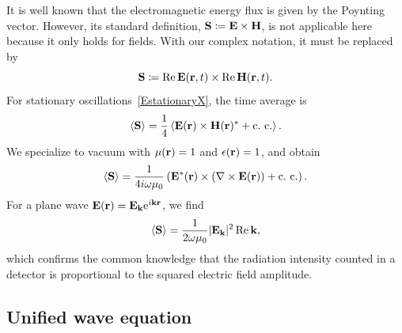 It is well known that the electromagnetic energy flux is given by the Poynting vector.
%
%
%
However, its standard definition, $\mathbf{S}\coloneqq\mathbf{E}\times\mathbf{H}$,
is not applicable here because it only holds for  fields.
With our complex notation, it must be replaced by
\begin{equation}
  \mathbf{S}\coloneqq \operatorname{Re}\mathbf{E}(\mathbf{r},t)\times\operatorname{Re}\mathbf{H}(\mathbf{r},t).
\end{equation}
%
For stationary oscillations~\cref{EstationaryX},
the time average is
\begin{equation}
  \braket{\mathbf{S}} = \frac{1}{4}\braket{\mathbf{E}(\mathbf{r}) \times \mathbf{H}(\mathbf{r})^* + \text{c.~c.}}.
\end{equation}
%
We specialize to vacuum with $\mathsf{\mu}(\mathbf{r})=1$ and $\mathsf{\epsilon}(\mathbf{r})=1$,
and obtain
\begin{equation}
  \braket{\mathbf{S}}
  = \frac{1}{4i\omega\mu_0}
    \left( \mathbf{E}^*(\mathbf{r})\times\left(\mathbf{\nabla}\times\mathbf{E}(\mathbf{r})\right) + \text{c.~c.} \right).
\end{equation}
For a plane wave $\mathbf{E}(\mathbf{r})=\mathbf{E}_{\mathbf{k}} \mathrm e^{i\mathbf{k}\mathbf{r}}$, we find
\begin{equation}
  \braket{\mathbf{S}}
  = \frac{1}{2\omega\mu_0} |\mathbf{E}_{\mathbf{k}}|^2 \operatorname{Re} \mathbf{k},
\end{equation}
which confirms the common knowledge that the radiation intensity
counted in a detector is proportional to the squared electric field amplitude.


%
%

\subsection{Unified wave equation}\label{SuniWave}

